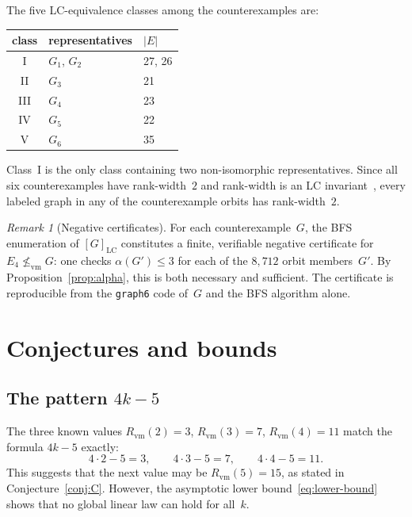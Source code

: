 \documentclass[11pt]{amsart}
\theoremstyle{definition}
\theoremstyle{remark}
\newtheorem{remark}[theorem]{Remark}
\newcommand{\Rvm}{R_{\mathrm{vm}}}
\newcommand{\LC}{\mathrm{LC}}
\newcommand{\vm}{\leq_{\mathrm{vm}}}
\begin{document}
The five LC-equivalence classes among the counterexamples are:
\begin{center}
  \begin{tabular}{cll}
    \toprule
    class & representatives & $|E|$ \\
    \midrule
    I   & $G_1$, $G_2$ & 27, 26 \\
    II  & $G_3$         & 21 \\
    III & $G_4$         & 23 \\
    IV  & $G_5$         & 22 \\
    V   & $G_6$         & 35 \\
    \bottomrule
  \end{tabular}
\end{center}
Class~I is the only class containing two non-isomorphic representatives.
Since all six counterexamples have rank-width~$2$ and rank-width is an
LC invariant~\cite{Oum2005}, every labeled graph in any of the
counterexample orbits has rank-width~$2$.

\begin{remark}[Negative certificates]\label{rmk:certificates}
  For each counterexample~$G$, the BFS enumeration of $[G]_{\LC}$
  constitutes a finite, verifiable negative certificate for
  $E_4\not\vm G$: one checks $\alpha(G')\leq 3$ for each of the
  $8{,}712$ orbit members~$G'$.  By Proposition~\ref{prop:alpha}, this
  is both necessary and sufficient.  The certificate is reproducible
  from the \texttt{graph6} code of~$G$ and the BFS algorithm alone.
\end{remark}


\section{Conjectures and bounds}\label{sec:conjectures}

\subsection{The pattern $4k-5$}

The three known values $\Rvm(2)=3$, $\Rvm(3)=7$, $\Rvm(4)=11$
match the formula $4k-5$ exactly:
\[
  4\cdot 2 - 5 = 3,\qquad
  4\cdot 3 - 5 = 7,\qquad
  4\cdot 4 - 5 = 11.
\]
This suggests that the next value may be $\Rvm(5)=15$, as stated in
Conjecture~\ref{conj:C}.  However, the asymptotic lower
bound~\eqref{eq:lower-bound} shows that no global linear law can hold
for all~$k$.
\end{document}
